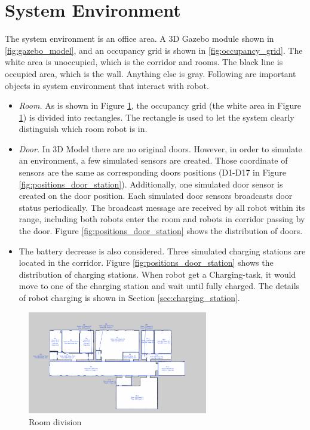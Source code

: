 \section{System Environment}
The system environment is an office area. A 3D Gazebo module shown in \ref{fig:gazebo_model}, and an occupancy grid is shown in \ref{fig:occupancy_grid}. The white area is unoccupied, which is the corridor and rooms. The black line is occupied area, which is the wall. Anything else is gray.
Following are important objects in system environment that interact with robot.
\begin{itemize}
	\item \textsl{Room.} As is shown in Figure \ref{fig:room_division}, the occupancy grid (the white area in Figure \ref{fig:room_division}) is divided into rectangles. The rectangle is used to let the system clearly distinguish which room robot is in.
	\item \textsl{Door.} In 3D Model there are no original doors. However, in order to simulate an environment, a few simulated sensors are created. Those coordinate of sensors are the same as corresponding doors positions (D1-D17 in Figure \ref{fig:positions_door_station}).
	Additionally, one simulated door sensor is created on the door position. Each simulated door sensors broadcasts door status periodically. The broadcast message are received by all robot within its range, including both robots enter the room and robots in corridor passing by the door.
	Figure \ref{fig:positions_door_station} shows the distribution of doors.
	\item {} The battery decrease is also considered. Three simulated charging stations are located in the corridor. Figure \ref{fig:positions_door_station} shows the distribution of charging stations. 
	When robot get a Charging-task, it would move to one of the charging station and wait until fully charged. The details of robot charging is shown in Section \ref{sec:charging_station}.
	
\end{itemize}

\begin{figure}[htbp]
	\centering
	\includegraphics[width = 0.7\textwidth]{content/images/ch3/room_division.png}
	\caption{Room division}
	\label{fig:room_division}
\end{figure}

